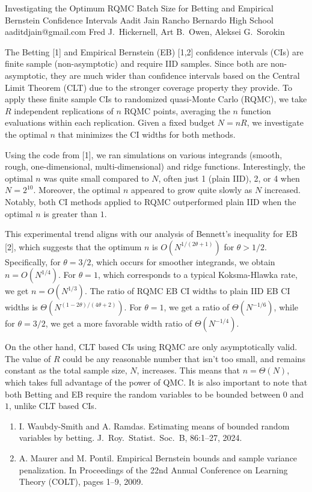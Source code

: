 \begin{talk}
  {Investigating the Optimum RQMC Batch Size for Betting and Empirical Bernstein Confidence Intervals}%
  {Aadit Jain}%
  {Rancho Bernardo High School}%
  {aaditdjain@gmail.com}%
  {Fred J.\ Hickernell, Art B.\ Owen, Aleksei G.\ Sorokin}%
  
    
   

The Betting [1] and Empirical Bernstein (EB) [1,2] confidence intervals (CIs) are finite sample (non-asymptotic) and require IID samples. Since both are non-asymptotic, they are much wider than confidence intervals based on the Central Limit Theorem (CLT) due to the stronger coverage property they provide. To apply these finite sample CIs to randomized quasi-Monte Carlo (RQMC), we take $R$ independent replications of $n$ RQMC points, averaging the $n$ function evaluations within each replication. Given a fixed budget $N = nR$, we investigate the optimal $n$ that minimizes the CI widths for both methods.  

Using the code from [1], we ran simulations on various integrands (smooth, rough, one-dimensional, multi-dimensional) and ridge functions. Interestingly, the optimal $n$ was quite small compared to $N$, often just 1 (plain IID), 2, or 4 when $N = 2^{10}$. Moreover, the optimal $n$ appeared to grow quite slowly as $N$ increased. Notably, both CI methods applied to RQMC outperformed plain IID when the optimal $n$ is greater than $1$.  

This experimental trend aligns with our analysis of Bennett’s inequality for EB [2], which suggests that the optimum $n$ is $O(N^{1/(2\theta + 1)})$ for $\theta > 1/2$. 
Specifically, for $\theta = 3/2$, which occurs for smoother integrands, we obtain $n = O(N^{1/4})$. For $\theta = 1$, which corresponds to a typical Koksma-Hlawka rate, we get $n = O(N^{1/3})$. The ratio of RQMC EB CI widths to plain IID EB CI widths is $\Theta( N^{(1-2\theta)/(4\theta+2)})$. For $\theta=1$,
we get a ratio of $\Theta(N^{-1/6})$,
while for $\theta=3/2$,
we get a more favorable width ratio of $\Theta(N^{-1/4})$. 


On the other hand, CLT based CIs using RQMC  are only asymptotically valid. The value of $R$ could be any reasonable number that isn't too small, and remains constant as the total sample size, $N$, increases.  This means that $n = \Theta(N)$, which takes full advantage of the power of QMC.  It is also important to note that both Betting and EB require the random variables to be bounded between $0$ and $1$, unlike CLT based CIs. 


\begin{enumerate}
 \item[{[1]}] I. Waubdy-Smith and A. Ramdas. Estimating means of bounded random
variables by betting. J.\ Roy.\ Statist.\ Soc.\ B, 86:1--27, 2024.
 \item[{[2]}] A. Maurer and M. Pontil. Empirical Bernstein bounds and sample variance penalization. In Proceedings of the 22nd Annual Conference
on Learning Theory (COLT), pages 1--9, 2009.
\end{enumerate}


\end{talk}
